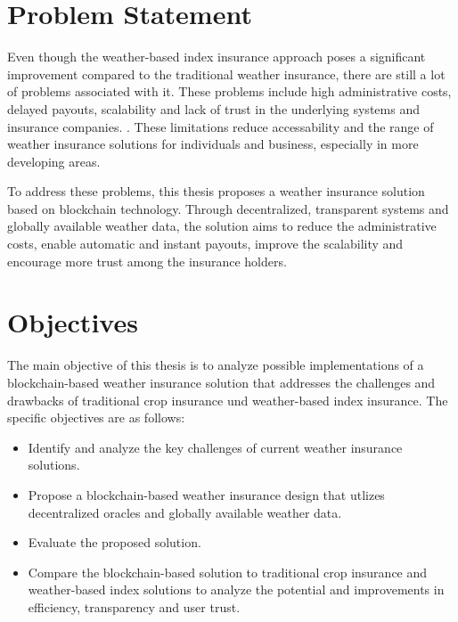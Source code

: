 \section{Problem Statement}\label{section:problem_statement}
Even though the weather-based index insurance approach poses a significant improvement compared to the traditional weather insurance, there are still a lot of problems associated with it. These problems include high administrative costs, delayed payouts, scalability and lack of trust in the underlying systems and insurance companies. \autocite{skees2008challenges}. These limitations reduce accessability and the range of weather insurance solutions for individuals and business, especially in more developing areas.

To address these problems, this thesis proposes a weather insurance solution based on blockchain technology. Through decentralized, transparent systems and globally available weather data, the solution aims to reduce the administrative costs, enable automatic and instant payouts, improve the scalability and encourage more trust among the insurance holders.

\section{Objectives}\label{section:objectives}

The main objective of this thesis is to analyze possible implementations of a blockchain-based weather insurance solution that addresses the challenges and drawbacks of traditional crop insurance und weather-based index insurance. The specific objectives are as follows:

\begin{itemize}
    \item Identify and analyze the key challenges of current weather insurance solutions.
    \item Propose a blockchain-based weather insurance design that utlizes decentralized oracles and globally available weather data.
    \item Evaluate the proposed solution.
    \item Compare the blockchain-based solution to traditional crop insurance and weather-based index solutions to analyze the potential and improvements in efficiency, transparency and user trust.
\end{itemize}
